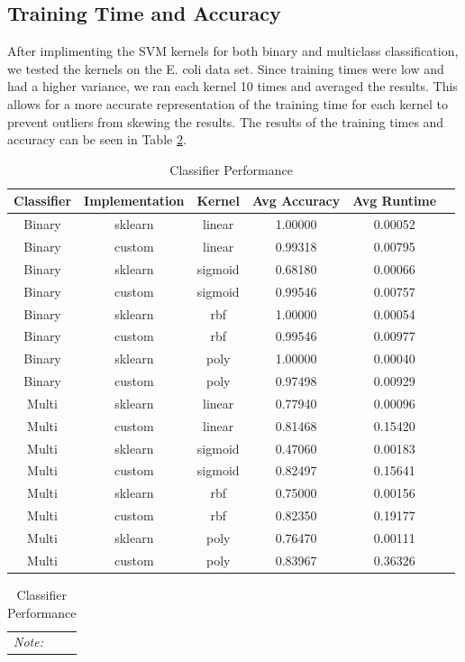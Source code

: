 \documentclass[12pt]{article}
\begin{document}
\subsection{Training Time and Accuracy}
After implimenting the SVM kernels for both binary and multiclass classification, we tested the kernels on the E. coli data set.
Since training times were low and had a higher variance, we ran each kernel 10 times and averaged the results.
This allows for a more accurate representation of the training time for each kernel to prevent outliers from skewing the results.
The results of the training times and accuracy can be seen in Table \ref{tab:classifier_performance}.
\begin{table}[h]
    \centering
    \caption{Classifier Performance}
    \label{tab:classifier_performance}
    \begin{tabular}{cccccc}
        \toprule
        \textbf{Classifier} & \textbf{Implementation} & \textbf{Kernel} & \textbf{Avg Accuracy} & \textbf{Avg Runtime} \\
        \midrule
        Binary & sklearn & linear & 1.00000 & 0.00052 \\
        Binary & custom & linear & 0.99318 & 0.00795 \\
        Binary & sklearn & sigmoid & 0.68180 & 0.00066 \\
        Binary & custom & sigmoid & 0.99546 & 0.00757 \\
        Binary & sklearn & rbf & 1.00000 & 0.00054 \\
        Binary & custom & rbf & 0.99546 & 0.00977 \\
        Binary & sklearn & poly & 1.00000 & 0.00040 \\
        Binary & custom & poly & 0.97498 & 0.00929 \\
        Multi & sklearn & linear & 0.77940 & 0.00096 \\
        Multi & custom & linear & 0.81468 & 0.15420 \\
        Multi & sklearn & sigmoid & 0.47060 & 0.00183 \\
        Multi & custom & sigmoid & 0.82497 & 0.15641 \\
        Multi & sklearn & rbf & 0.75000 & 0.00156 \\
        Multi & custom & rbf & 0.82350 & 0.19177 \\
        Multi & sklearn & poly & 0.76470 & 0.00111 \\
        Multi & custom & poly & 0.83967 & 0.36326 \\
        \bottomrule
    \end{tabular}
    \vspace{1em}  %
    \begin{tabular}{p{}}  %
        \multicolumn{1}{l}{\textit{Note:}} These times were calculated with 10 runs for each kernel and averaged. \\
    \end{tabular}
\end{table}
\end{document}
